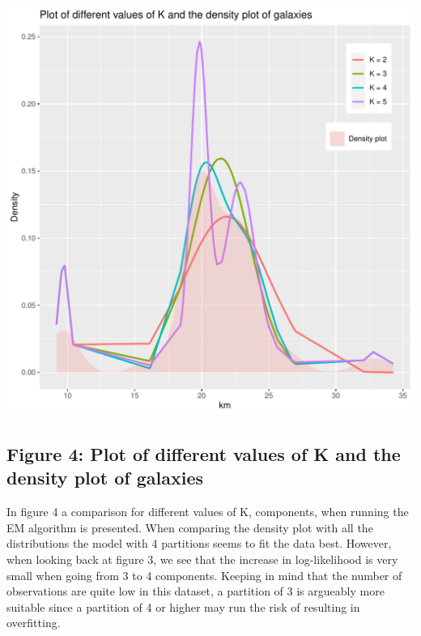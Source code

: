 \documentclass{article}\usepackage[]{graphicx}\usepackage[]{color}
\makeatletter
\def\maxwidth{ %
  \ifdim\Gin@nat@width>\linewidth
    \linewidth
  \else
    \Gin@nat@width
  \fi
}
\newenvironment{knitrout}{}{} %
\makeatother
\begin{document}
\begin{knitrout}
\color{fgcolor}
\includegraphics[width=\maxwidth]{figure/unnamed-chunk-16-1} 

\end{knitrout}

\subsection{Figure 4: Plot of different values of K and the density plot of galaxies}

In figure 4 a comparison for different values of K, components, when running the EM algorithm is presented. When comparing the density plot with all the distributions the model with 4 partitions seems to fit the data best. However, when looking back at figure 3, we see that the increase in log-likelihood is very small when going from 3 to 4 components. Keeping in mind that the number of observations are quite low in this dataset, a partition of 3 is argueably more suitable since a partition of 4 or higher may run the risk of resulting in overfitting. 
\end{document}
